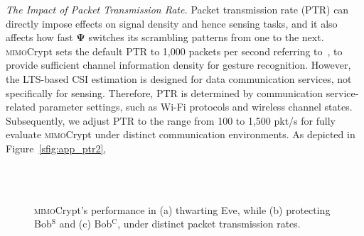 \documentclass[conference,compsoc]{IEEEtran}
\newcommand{\sname}{\textsc{mimo}Crypt\xspace}
\newcommand{\rev}[1]{{\color{blue}#1}}      %
\newcommand{\newrev}[1]{{\color{blue}#1}}    %
\newcommand{\rev}[1]{#1}
\newcommand{\newrev}[1]{#1}
\begin{document}
\noindent\emph{The Impact of Packet Transmission Rate.}
Packet transmission rate (PTR) can directly impose effects on signal density and hence sensing tasks, \newrev{and it also affects how fast $\bm{\Psi}$ switches its scrambling patterns from one to the next.} \sname sets the default PTR to 1,000 packets per second referring to~\cite{Widar3-MobiSys19, WiSee-MobiCom13,oneshot_sensing}, to provide sufficient channel information density for gesture recognition. However, the LTS-based CSI estimation is designed for data communication services, not specifically for sensing. Therefore, PTR is determined by communication service-related parameter settings, such as Wi-Fi protocols and wireless channel states. \rev{Subsequently, we adjust PTR to the range from 100 to 1,500 pkt/s} %
for fully evaluate \sname under distinct communication environments. As depicted in Figure~\ref{sfig:app_ptr2}, 
%
\begin{figure}[t]
	\setlength\abovecaptionskip{8pt}
	\centering
        \vspace{-2ex}
	\\
         \vspace{-2ex}
	\\
	\caption{\sname's performance in (a) thwarting Eve, while (b) protecting Bob$^{\mathrm{S}}$ and (c) Bob$^{\mathrm{C}}$, under distinct packet transmission rates.}
	\label{fig:app_ptr}
	\vspace{-1.5ex}
\end{figure}
\end{document}
